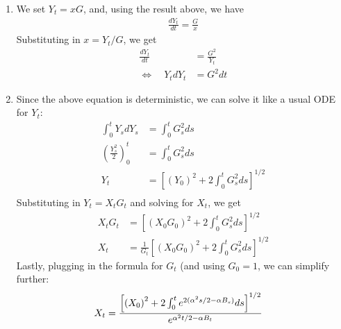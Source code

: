 \documentclass[12pt]{article}
\theoremstyle{plain}
\theoremstyle{definition}
\theoremstyle{remark}
\begin{document}
\begin{enumerate}
\begin{enumerate}
      \item %
        We set $Y_t = xG$, and, using the result above, we have
        \begin{align*}
          \frac{dY_t}{dt} = \frac{G}{x}
        \end{align*}
        Substituting in $x=Y_t/G$, we get
        \begin{align*}
          \frac{dY_t}{dt} &= \frac{G^2}{Y_t}
          \\
          \Leftrightarrow \quad
          Y_t dY_t &= G^2 dt
        \end{align*}

      \item %
        Since the above equation is deterministic, we can solve it like
        a usual ODE for $Y_t$:
        \begin{align*}
          \int^t_0 Y_s dY_s &= \int^t_0 G_s^2 ds \\
          \left(\frac{Y_s^2}{2}\right)^t_0
          &= \int^t_0 G_s^2 ds \\
          Y_t
          &= \left[\left(Y_0\right)^2 + 2\int^t_0 G_s^2 ds\right]^{1/2} \\
        \end{align*}
        Substituting in $Y_t = X_t G_t$ and solving for $X_t$, we get
        \begin{align*}
          X_t G_t
          &= \left[\left(X_0G_0\right)^2
            + 2\int^t_0 G_s^2 ds\right]^{1/2} \\
          X_t
          &= \frac{1}{G_t}\left[\left(X_0G_0\right)^2
            + 2\int^t_0 G_s^2 ds\right]^{1/2}
        \end{align*}
        Lastly, plugging in the formula for $G_t$ (and using $G_0=1$, we
        can simplify further:
        \begin{align*}
          X_t
          &= \frac{%
            \left[\left(X_0\right)^2
            + 2\int^t_0 e^{2(\alpha^2 s/2 -\alpha B_s) } ds\right]^{1/2}
          }{e^{ \alpha^2 t/2 - \alpha B_t} }
        \end{align*}

    \end{enumerate}


\end{enumerate}
\end{document}
